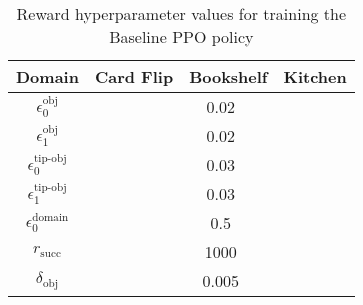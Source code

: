 \begin{table}[H]
\centering
\begin{tabular}{|c|c|c|c|}
\hline
\textbf{Domain} & \multicolumn{1}{c|}{\textbf{Card Flip}} & \multicolumn{1}{c|}{\textbf{Bookshelf}} & \multicolumn{1}{c|}{\textbf{Kitchen}} \\ \hline
$\epsilon_0^{\text{obj}}$       & \multicolumn{3}{c|}{0.02} \\ \hline
$\epsilon_1^{\text{obj}}$       & \multicolumn{3}{c|}{0.02} \\ \hline
$\epsilon_0^{\text{tip-obj}}$       & \multicolumn{3}{c|}{0.03} \\ \hline
$\epsilon_1^{\text{tip-obj}}$       & \multicolumn{3}{c|}{0.03} \\ \hline
$\epsilon_0^{\text{domain}}$       & \multicolumn{3}{c|}{0.5} \\ \hline
$r_{\text{succ}}$ & \multicolumn{3}{c|}{1000} \\ \hline
$\delta_\text{obj}$ & \multicolumn{3}{c|}{0.005} \\ \hline
\end{tabular}
\caption{Reward hyperparameter values for training the Baseline PPO policy}\label{table:baseline_ppo_reward}
\end{table}